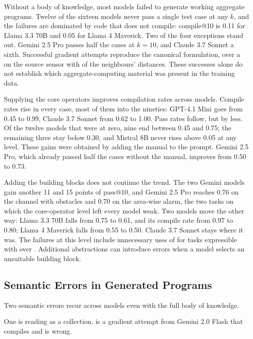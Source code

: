 Without a body of knowledge, most models failed to generate working aggregate programs.
%
Twelve of the sixteen models never pass a single test case at any $k$,
and the failures are dominated by code that does not compile:
compile@10 is 0.11 for Llama 3.3 70B and 0.05 for Llama 4 Maverick.
%
Two of the four exceptions stand out.
%
Gemini 2.5 Pro passes half the cases at $k=10$, and Claude 3.7 Sonnet a sixth.
%
Successful gradient attempts reproduce the canonical formulation,
 over a  on the source sensor with  of the neighbours' distances.
%
These successes alone do not establish which aggregate-computing material was present in the training data.

Supplying the core operators improves compilation rates across models.
%
Compile rates rise in every case, most of them into the nineties:
GPT-4.1 Mini goes from 0.45 to 0.99,
Claude 3.7 Sonnet from 0.62 to 1.00.
%
Pass rates follow, but by less.
%
Of the twelve models that were at zero, nine end between 0.45 and 0.75;
the remaining three stay below 0.30, and Mistral 8B never rises above 0.05 at any level.
%
These gains were obtained by adding the manual to the prompt.
Gemini 2.5 Pro, which already passed half the cases without the manual, improves from 0.50 to 0.73.

Adding the building blocks does not continue the trend.
%
The two Gemini models gain another 11 and 15 points of pass@10,
and Gemini 2.5 Pro reaches 0.76 on the channel with obstacles and 0.70 on the area-wise alarm,
the two tasks on which the core-operator level left every model weak.
%
Two models move the other way:
Llama 3.3 70B falls from 0.75 to 0.61, and its compile rate from 0.97 to 0.80;
Llama 4 Maverick falls from 0.55 to 0.50.
%
Claude 3.7 Sonnet stays where it was.
%
The failures at this level include unnecessary uses of  for tasks expressible with  over .
Additional abstractions can introduce errors when a model selects an unsuitable building block.

\subsection{Semantic Errors in Generated Programs}
\label{subsec:llm-failure-modes}

Two semantic errors recur across models even with the full body of knowledge.

One is reading  as a collection.
%
 is a gradient attempt from Gemini 2.0 Flash that compiles and is wrong.

